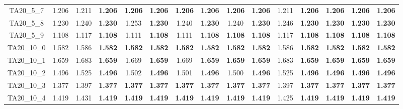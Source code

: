 \begin{tabular}{cc||ccccccccccccc}
TA20\_5\_7         & 1.206            & 1.211            & {\bf 1.206}      & {\bf 1.206}      & {\bf 1.206}      & {\bf 1.206}      & {\bf 1.206}      & {\bf 1.206}      & {\bf 1.206}      & 1.211            & {\bf 1.206}      & {\bf 1.206}      & {\bf 1.206}      & {\bf 1.206}     \\ 
TA20\_5\_8         & 1.230            & 1.240            & {\bf 1.230}      & 1.253            & {\bf 1.230}      & 1.240            & {\bf 1.230}      & 1.240            & {\bf 1.230}      & 1.246            & {\bf 1.230}      & {\bf 1.230}      & {\bf 1.230}      & {\bf 1.230}     \\ 
TA20\_5\_9         & 1.108            & 1.117            & {\bf 1.108}      & 1.111            & {\bf 1.108}      & 1.111            & {\bf 1.108}      & {\bf 1.108}      & {\bf 1.108}      & 1.117            & {\bf 1.108}      & {\bf 1.108}      & {\bf 1.108}      & {\bf 1.108}     \\ 
TA20\_10\_0        & 1.582            & 1.586            & {\bf 1.582}      & {\bf 1.582}      & {\bf 1.582}      & {\bf 1.582}      & {\bf 1.582}      & {\bf 1.582}      & {\bf 1.582}      & 1.586            & {\bf 1.582}      & {\bf 1.582}      & {\bf 1.582}      & {\bf 1.582}     \\ 
TA20\_10\_1        & 1.659            & 1.683            & {\bf 1.659}      & 1.669            & {\bf 1.659}      & 1.669            & {\bf 1.659}      & {\bf 1.659}      & {\bf 1.659}      & 1.683            & {\bf 1.659}      & {\bf 1.659}      & {\bf 1.659}      & {\bf 1.659}     \\ 
TA20\_10\_2        & 1.496            & 1.525            & {\bf 1.496}      & 1.502            & {\bf 1.496}      & 1.501            & {\bf 1.496}      & 1.500            & {\bf 1.496}      & 1.525            & {\bf 1.496}      & {\bf 1.496}      & {\bf 1.496}      & {\bf 1.496}     \\ 
TA20\_10\_3        & 1.377            & 1.397            & {\bf 1.377}      & {\bf 1.377}      & {\bf 1.377}      & {\bf 1.377}      & {\bf 1.377}      & {\bf 1.377}      & {\bf 1.377}      & 1.397            & {\bf 1.377}      & {\bf 1.377}      & {\bf 1.377}      & {\bf 1.377}     \\ 
TA20\_10\_4        & 1.419            & 1.431            & {\bf 1.419}      & {\bf 1.419}      & {\bf 1.419}      & {\bf 1.419}      & {\bf 1.419}      & {\bf 1.419}      & {\bf 1.419}      & 1.425            & {\bf 1.419}      & {\bf 1.419}      & {\bf 1.419}      & {\bf 1.419}     \\ 

\end{tabular}
